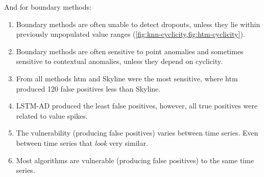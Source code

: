 And for boundary methods:
\begin{enumerate}
    \item Boundary methods are often unable to detect dropouts, unless they
    lie within previously unpopulated value ranges (\cref{fig:knn-cyclicity,fig:htm-cyclicity}).
    \item Boundary methods are often sensitive to point anomalies and sometimes 
    sensitive to contextual anomalies, unless they depend on cyclicity.
    \item From all methods \gls{htm} and Skyline were the most sensitive,
    where \gls{htm} produced 120 false positives less than Skyline.
    \item LSTM-AD produced the least false positives, however, all true positives
    were related to value spikes.
    \item The vulnerability (producing false positives) varies between time series.
    Even between time series that \textit{look} very similar.
    \item Most algorithms are vulnerable (producing false positives) to the same time series.
\end{enumerate}